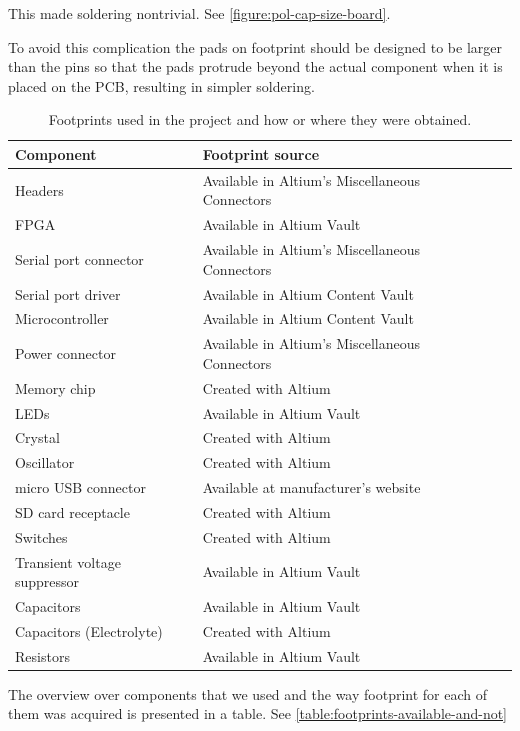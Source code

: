 This made soldering nontrivial.
See \vref{figure:pol-cap-size-board}.

To avoid this complication the pads on footprint should be designed to be larger than the pins so that the pads protrude beyond the actual component when it is placed on the PCB, resulting in simpler soldering.

 \begin{table}[H]
 \begin{center}
 \begin{tabular}{| l | l | l |}
 \hline
 \textbf{Component} & \textbf{Footprint source}\\
 \hline
 Headers & Available in Altium's Miscellaneous Connectors \\
 FPGA & Available in Altium Vault \\
 Serial port connector & Available in Altium's Miscellaneous Connectors \\
 Serial port driver & Available in Altium Content Vault \\
 Microcontroller & Available in Altium Content Vault \\
 Power connector &  Available in Altium's Miscellaneous Connectors\\
 Memory chip & Created with Altium \\
 LEDs &  Available in Altium Vault\\
 Crystal &  Created with Altium \\
 Oscillator &  Created with Altium \\
 micro USB connector & Available at manufacturer's website \\
 SD card receptacle & Created with Altium \\
 Switches & Created with Altium \\
 Transient voltage suppressor & Available in Altium Vault \\
 Capacitors & Available in Altium Vault \\
 Capacitors (Electrolyte) & Created with Altium \\
 Resistors & Available in Altium Vault \\
 \hline
 \end{tabular}
 \caption{Footprints used in the project and how or where they were obtained.}
 \label{table:footprints-available-and-not}
 \end{center}
 \end{table}


The overview over components that we used and the way footprint for each of them was acquired is presented in a table. See \vref{table:footprints-available-and-not}
